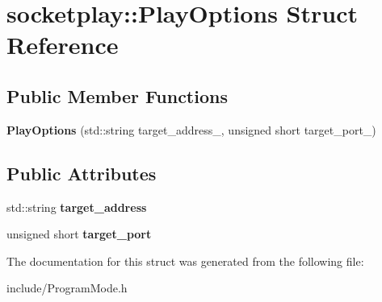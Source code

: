 \hypertarget{structsocketplay_1_1PlayOptions}{}\section{socketplay\+:\+:Play\+Options Struct Reference}
\label{structsocketplay_1_1PlayOptions}
\subsection*{Public Member Functions}
\begin{DoxyCompactItemize}
\item 
{\bfseries Play\+Options} (std\+::string target\+\_\+address\+\_\+, unsigned short target\+\_\+port\+\_\+)\hypertarget{structsocketplay_1_1PlayOptions_ab1cf8ee39cc63a3857d42951add7b86c}{}\label{structsocketplay_1_1PlayOptions_ab1cf8ee39cc63a3857d42951add7b86c}

\end{DoxyCompactItemize}
\subsection*{Public Attributes}
\begin{DoxyCompactItemize}
\item 
std\+::string {\bfseries target\+\_\+address}\hypertarget{structsocketplay_1_1PlayOptions_ab2aa7b27ed3985932ca347f3d0f3e430}{}\label{structsocketplay_1_1PlayOptions_ab2aa7b27ed3985932ca347f3d0f3e430}

\item 
unsigned short {\bfseries target\+\_\+port}\hypertarget{structsocketplay_1_1PlayOptions_af6847caf513741f121fb518b69e7398a}{}\label{structsocketplay_1_1PlayOptions_af6847caf513741f121fb518b69e7398a}

\end{DoxyCompactItemize}


The documentation for this struct was generated from the following file\+:\begin{DoxyCompactItemize}
\item 
include/Program\+Mode.\+h\end{DoxyCompactItemize}
